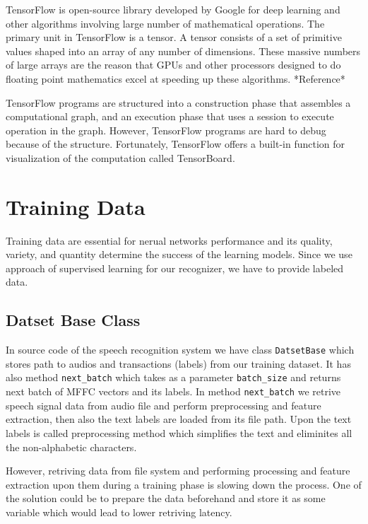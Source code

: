 TensorFlow is open-source library developed by Google for deep learning and other algorithms involving large number of mathematical operations.
The primary unit in TensorFlow is a tensor.
A tensor consists of a set of primitive values shaped into an array of any number of dimensions.
These massive numbers of large arrays are the reason that GPUs and other processors designed to do floating point mathematics excel at speeding up these algorithms. *Reference*

TensorFlow programs are structured into a construction phase that assembles a computational graph, and an execution phase that uses a session to execute operation in the graph.
However, TensorFlow programs are hard to debug because of the structure. Fortunately, TensorFlow offers a built-in function for visualization of the computation called TensorBoard.

\section{Training Data}

Training data are essential for nerual networks performance and its quality, variety, and quantity determine the success of the learning models.
Since we use approach of supervised learning for our recognizer, we have to provide labeled data.

\subsection{Datset Base Class}

In source code of the speech recognition system we have class \texttt{DatsetBase} which stores path to audios and transactions (labels) from our training dataset.
It has also method \texttt{next\_batch} which takes as a parameter \texttt{batch\_size} and returns next batch of MFFC vectors and its labels.
In method \texttt{next\_batch} we retrive speech signal data from audio file and perform preprocessing and feature extraction, then also the text labels are loaded from its file path.
Upon the text labels is called preprocessing method which simplifies the text and eliminites all the non-alphabetic characters.

However, retriving data from file system and performing processing and feature extraction upon them during a training phase is slowing down the process.
One of the solution could be to prepare the data beforehand and store it as some variable which would lead to lower retriving latency.

